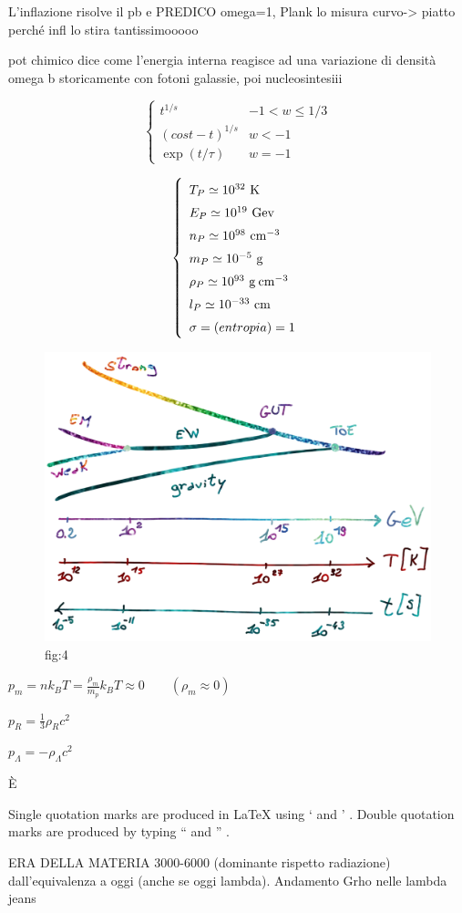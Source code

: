 L'inflazione risolve il pb e PREDICO omega=1, Plank lo misura
curvo-> piatto perché infl lo stira tantissimooooo

pot chimico dice come l'energia interna reagisce ad una variazione di densità
omega b storicamente con fotoni galassie, poi nucleosintesiii

\begin{equation}
    \left\{\begin{matrix}
        t^{1/s} & -1 < w \le 1/3\\ 
        (cost-t)^{1/s} & w<-1 \\
        \exp (t/\tau)&  w=-1
       \end{matrix}\right.
\end{equation}

\begin{equation}\left\{
    \def\arraystretch{1.5}
        \begin{array}{ll}
        T_P \simeq 10^{32}~\mathrm{K} \\
        E_P \simeq 10^{19}~\mathrm{Gev} \\
        n_P \simeq 10^{98}~\mathrm{cm}^{-3} \\
        m_P \simeq 10^{-5}~\mathrm{g} \\
        \rho_P \simeq 10^{93}~\mathrm{g\: cm}^{-3}  \\
        l_P \simeq 10^{-33}~\mathrm{cm} \\
        \sigma = (entropia) = 1 
    \end{array}\right. \label{eq:unitaplanckiane}
\end{equation}


\begin{figure}[H]
    \centering
    \includegraphics[width=.55 \textwidth]{Pictures/5/fasiprimordiali.png}
    \caption{fig:4}
\end{figure}

\hslash


\begin{example}
$p_m=nk_B T = \frac{\rho_m}{m_p}k_B T \approx 0 \qquad ( \rho_m \approx 0) $
\end{example}
\begin{example}
$p_R=\frac{1}{3} \rho_R c^2 $
\end{example}
\begin{example}
$p_\Lambda= -\rho_\Lambda c^2 $
\end{example}



È

Single quotation marks are produced in LaTeX using ` and ' . Double quotation marks are produced by typing `` and '' .



ERA DELLA MATERIA 3000-6000 (dominante rispetto radiazione)  dall'equivalenza a oggi (anche se oggi lambda).
Andamento Grho nelle lambda jeans